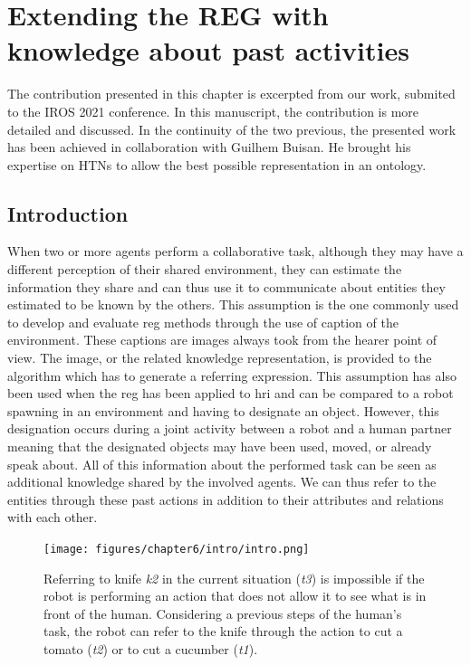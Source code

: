 \ifdefined{}
\else
\setcounter{chapter}{6} %
\dominitoc
\faketableofcontents
\fi

\chapter{Extending the REG with knowledge about past activities}
\minitoc

The contribution presented in this chapter is excerpted from our work, submited to the IROS 2021 conference. In this manuscript, the contribution is more detailed and discussed. In the continuity of the two previous, the presented work has been achieved in collaboration with Guilhem Buisan. He brought his expertise on HTNs to allow the best possible representation in an ontology.

\section{Introduction}

When two or more agents perform a collaborative task, although they may have a different perception of their shared environment, they can estimate the information they share and can thus use it to communicate about entities they estimated to be known by the others. This assumption is the one commonly used to develop and evaluate \acrfull{reg} methods through the use of caption of the environment\cite{duboue_2015_evaluating}. These captions are images always took from the hearer point of view. The image, or the related knowledge representation, is provided to the algorithm which has to generate a referring expression. This assumption has also been used when the \acrshort{reg} has been applied to \acrfull{hri} and can be compared to a robot spawning in an environment and having to designate an object. However, this designation occurs during a joint activity between a robot and a human partner meaning that the designated objects may have been used, moved, or already speak about. All of this information about the performed task can be seen as additional knowledge shared by the involved agents. We can thus refer to the entities through these past actions in addition to their attributes and relations with each other.

\begin{figure}[ht!]
\centering
\texttt{[image: figures/chapter6/intro/intro.png]}
\caption{\label{fig:chap6_intro} Referring to knife \textit{k2} in the current situation (\textit{t3}) is impossible if the robot is performing an action that does not allow it to see what is in front of the human. Considering a previous steps of the human's task, the robot can refer to the knife through the action to cut a tomato (\textit{t2}) or to cut a cucumber (\textit{t1}).}
\end{figure}


